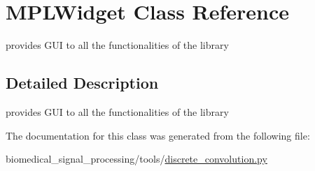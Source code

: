 \hypertarget{classMPLWidget}{}\section{M\+P\+L\+Widget Class Reference}
\label{classMPLWidget}


provides G\+UI to all the functionalities of the library  




\subsection{Detailed Description}
provides G\+UI to all the functionalities of the library 

The documentation for this class was generated from the following file\+:\begin{DoxyCompactItemize}
\item 
biomedical\+\_\+signal\+\_\+processing/tools/\hyperlink{discrete__convolution_8py}{discrete\+\_\+convolution.\+py}\end{DoxyCompactItemize}
